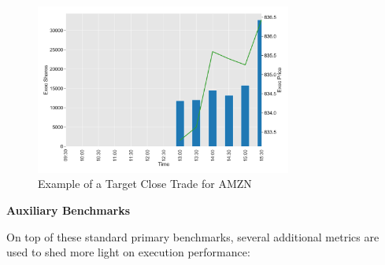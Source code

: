 	\begin{figure}[!ht]
	\centering
	\includegraphics[width=0.75\textwidth]{chapters/chapter_exec_models/figures/close.png} 
	\caption{Example of a Target Close Trade for AMZN \label{fig:close}}
	\end{figure}


\noindent\textbf{Auxiliary Benchmarks} 


On top of these standard primary benchmarks, several additional metrics are used to shed more light on execution performance:

